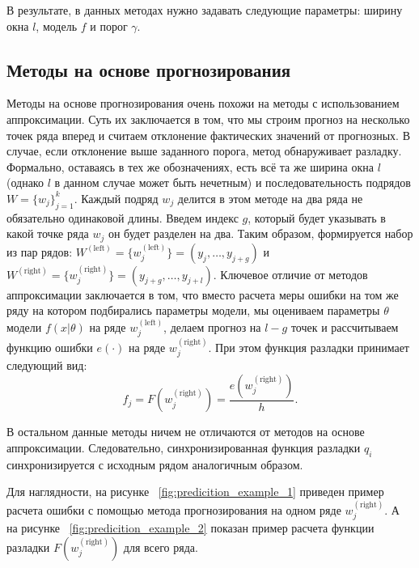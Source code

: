 \documentclass[%
12pt,
master,  %
natbib,      %
subf,        %
substylefile = spbu.rtx,
href,        %
colorlinks,  %
]{disser}
\begin{document}
В результате, в данных методах нужно задавать следующие параметры: ширину окна $l$, модель $f$ и порог $\gamma$.

\subsection{Методы на основе прогнозирования}

Методы на основе прогнозирования очень похожи на методы с использованием аппроксимации. Суть их заключается в том, что мы строим прогноз на несколько точек ряда вперед и считаем отклонение фактических значений от прогнозных. В случае, если отклонение выше заданного порога, метод обнаруживает разладку.
Формально, оставаясь в тех же обозначениях, есть всё та же ширина окна $l$ (однако $l$ в данном случае может быть нечетным) и последовательность подрядов $W = \{ w_j \}_{j=1}^k$. Каждый подряд  $w_j$ делится в этом методе на два ряда не обязательно одинаковой длины. Введем индекс $g$, который будет указывать в какой точке ряда $w_j$ он будет разделен на два. Таким образом, формируется набор из пар рядов:  $ W^{\mathrm{(left)}} = \{w_j^{\mathrm{(left)}} \}  =  (y_j, \dots, y_{j+g})$ и $W^{\mathrm{(right)}} = \{w_j^{\mathrm{(right)}} \} = (y_{j+g}, \dots, y_{j+l})$. Ключевое отличие от методов аппроксимации заключается в том, что вместо расчета меры ошибки на том же ряду на котором подбирались параметры модели, мы оцениваем параметры $\theta$ модели $f(x|\theta)$ на ряде $ w_j^{\mathrm{(left)}} $, делаем прогноз на $ l - g $ точек и рассчитываем функцию ошибки $ e(\cdot) $ на ряде $ w_j^{\mathrm{(right)}} $. При этом функция разладки принимает следующий вид:
	\begin{equation*}
	 f_j = F(w_j^{\mathrm{(right)}}) = \frac{e(w_j^{\mathrm{(right)}})}{h}.
	 \end{equation*}

В остальном данные методы ничем не отличаются от методов на основе аппроксимации. Следовательно, синхронизированная функция разладки $q_i$ синхронизируется с исходным рядом аналогичным образом.

Для наглядности, на рисунке ~\ref{fig:predicition_example_1} приведен пример расчета ошибки с помощью метода прогнозирования на одном ряде  $ w_j^{\mathrm{(right)}} $. А на рисунке ~\ref{fig:predicition_example_2} показан пример расчета функции разладки $ F(w_j^{\mathrm{(right)}}) $ для всего ряда.
\end{document}
